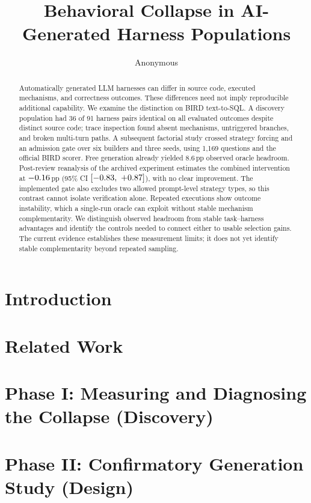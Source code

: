 \documentclass{article}
\title{Behavioral Collapse in AI-Generated Harness Populations}
\author{Anonymous}
\begin{document}
\maketitle

\begin{abstract}
Automatically generated LLM harnesses can differ in source code, executed
mechanisms, and correctness outcomes. These differences need not imply
reproducible additional capability. We examine the distinction on BIRD
text-to-SQL. A discovery population had 36 of 91 harness pairs identical on
all evaluated outcomes despite distinct source code; trace inspection found
absent mechanisms, untriggered branches, and broken multi-turn paths.
A subsequent factorial study crossed strategy forcing and an admission gate
over six builders and three seeds, using 1{,}169 questions and the official
BIRD scorer. Free generation already yielded 8.6\,pp observed oracle
headroom. Post-review reanalysis of the archived experiment estimates the
combined intervention at $-0.16$\,pp (95\% CI
$[-0.83,\ +0.87]$), with no clear improvement. The implemented gate
also excludes two allowed prompt-level strategy types, so this contrast
cannot isolate verification alone. Repeated executions show outcome
instability, which a single-run oracle can exploit without stable mechanism
complementarity. We distinguish observed headroom from stable task--harness
advantages and identify the controls needed to connect either to usable
selection gains. The current evidence establishes these measurement limits;
it does not yet identify stable complementarity beyond repeated sampling.
\end{abstract}

\section{Introduction}\label{sec:introduction}


\section{Related Work}\label{sec:related}


\section{Phase I: Measuring and Diagnosing the Collapse (Discovery)}\label{sec:phase1}


\section{Phase II: Confirmatory Generation Study (Design)}\label{sec:phase2}

\end{document}
